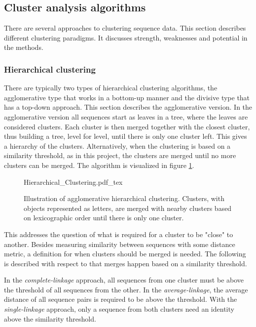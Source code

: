 \subsection{Cluster analysis algorithms}

There are several approaches to clustering sequence data. This section describes different clustering paradigms. It discusses strength, weaknesses and potential in the methods.

\subsubsection{Hierarchical clustering}

There are typically two types of hierarchical clustering algorithms, the
agglomerative type that works in a bottom-up manner and the divisive type that
has a top-down approach. This section describes the agglomerative version. In
the agglomerative version all sequences start as leaves in a tree, where the
leaves are considered clusters. Each cluster is then merged together with the
closest cluster, thus building a tree, level for level, until there is only one
cluster left. This gives a hierarchy of the clusters. Alternatively, when the
clustering is based on a similarity threshold, as in this project, the clusters
are merged until no more clusters can be merged. The algorithm is visualized in
figure \ref{fig:hierarchical_clustering}.

\begin{figure}[h!]
  \centering
  \def\svgwidth{\columnwidth}
  {Hierarchical_Clustering.pdf_tex}
  \caption{Illustration of agglomerative hierarchical clustering. Clusters,
    with objects represented as letters, are merged with nearby clusters based
    on lexicographic order until there is only one cluster.}
  \label{fig:hierarchical_clustering}
\end{figure}

This addresses the question of what is required for a cluster to be "close" to
another. Besides measuring similarity between sequences with some distance
metric, a definition for when clusters should be merged is needed. The
following is described with respect to that merges happen based on a similarity
threshold.

In the \textit{complete-linkage} approach, all sequences from one cluster must
be above the threshold of all sequences from the other. In the
\textit{average-linkage}, the average distance of all sequence pairs is
required to be above the threshold. With the \textit{single-linkage} approach,
only a sequence from both clusters need an identity above the similarity
threshold.

